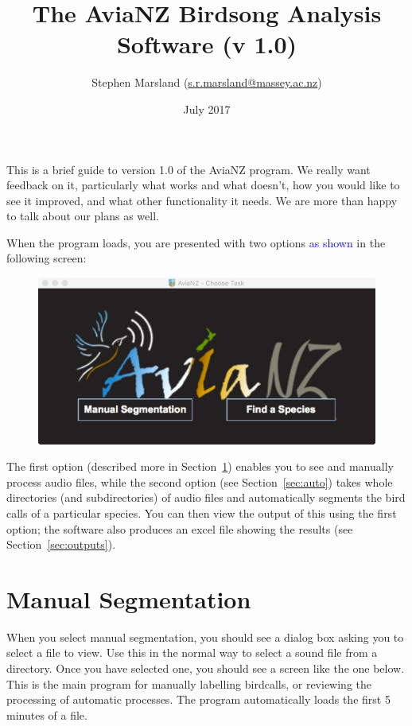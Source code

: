 \documentclass{article}
\title{The AviaNZ Birdsong Analysis Software (v 1.0)}
\author{Stephen Marsland (\url{s.r.marsland@massey.ac.nz})}
\date{July 2017}
\begin{document}
\maketitle


This is a brief guide to version 1.0 of the AviaNZ program. 
We really want feedback on it, particularly what works and what doesn't, how you would like to see it improved, and what other functionality it needs. We are more than happy to talk about our plans as well. 


When the program loads, you are presented with two options \textcolor{blue}{as shown} in the following screen:

\begin{figure}[h!]
\centering
\includegraphics[width=.3\textwidth]{Figs/splashscreen}
\end{figure}

The first option (described more in Section~\ref{sec:manual}) enables you to see and manually process audio files, while the second option (see Section~\ref{sec:auto}) takes whole directories (and subdirectories) of audio files and automatically segments the bird calls of a particular species. You can then view the output of this using the first option; the software also produces an excel file showing the results (see Section~\ref{sec:outputs}).  

\section{Manual Segmentation}
\label{sec:manual}

When you select manual segmentation, you should see a dialog box asking you to select a file to view. Use this in the normal way to select a sound file from a directory. Once you have selected one, you should see a screen like the one below. This is the main program for manually labelling birdcalls, or reviewing the processing of automatic processes.
The program automatically loads the first 5 minutes of a file. 
\end{document}
